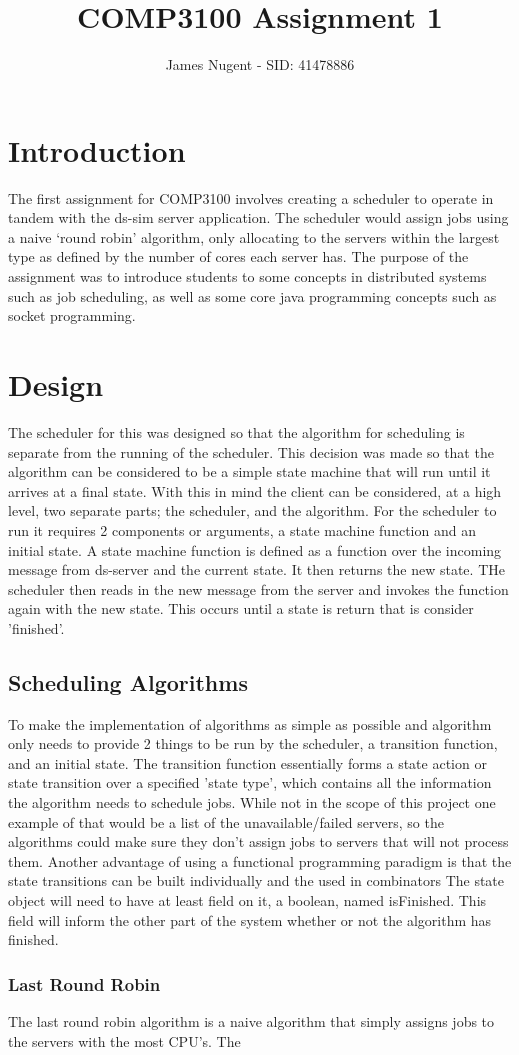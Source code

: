 \documentclass[12pt, letterpaper]{article}
\title{COMP3100 Assignment 1}
\author{James Nugent - SID: 41478886}
\begin{document}
\maketitle
\section*{Introduction}
The first assignment for COMP3100 involves creating a scheduler to operate in tandem with the ds-sim server application.
The scheduler would assign jobs using a naive `round robin' algorithm, only allocating to the servers within the largest type as defined by the number of cores each server has.
The purpose of the assignment was to introduce students to some concepts in distributed systems such as job scheduling, as well as some core java programming concepts such as socket programming.

\section*{Design}
The scheduler for this was designed so that the algorithm for scheduling is separate from the running of the scheduler.
This decision was made so that the algorithm can be considered to be a simple state machine that will run until it arrives at a final state. 
With this in mind the client can be considered, at a high level, two separate parts; the scheduler, and the algorithm.
\newline
For the scheduler to run it requires 2 components or arguments, a state machine function and an initial state. 
A state machine function is defined as a function over the incoming message from ds-server and the current state.
It then returns the new state. THe scheduler then reads in the new message from the server and invokes the function again with the new state.
This occurs until a state is return that is consider 'finished'. 
\subsection*{Scheduling Algorithms}
To make the implementation of algorithms as simple as possible and algorithm only needs to provide 2 things to be run by the scheduler, a transition function, and an initial state.
The transition function essentially forms a state action or state transition \cite{scala_fp} over a specified 'state type', which contains all the information the algorithm needs to schedule jobs.
While not in the scope of this project one example of that would be a list of the unavailable/failed servers, so the algorithms could make sure they don't assign jobs to servers that will not process them.
Another advantage of using a functional programming paradigm is that the state transitions can be built individually and the used in combinators \cite{scala_fp}
The state object will need to have at least field on it, a boolean, named isFinished. This field will inform the other part of the system whether or not the algorithm has finished.
\subsubsection*{Last Round Robin}
The last round robin algorithm is a naive algorithm that simply assigns jobs to the servers with the most CPU's. The 



\end{document}
